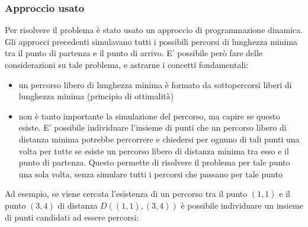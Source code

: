 \documentclass[a4paper,11pt]{article}
\begin{document}
\subsubsection{Approccio usato}

Per risolvere il problema è stato usato un approccio di programmazione dinamica. Gli approcci precedenti simulavano tutti i possibili percorsi di lunghezza minima tra il punto di partenza e il punto di arrivo. E' possibile però fare delle considerazioni su tale problema, e astrarne i concetti fondamentali:

\begin{itemize}
    \item un percorso libero di lunghezza minima è formato da sottopercorsi liberi di lunghezza minima (principio di ottimalità)

    \item non è tanto importante la simulazione del percorso, ma capire se questo esiste. E' possibile individuare l'insieme di punti che un percorso libero di distanza minima potrebbe percorrere e chiedersi per ognuno di tali punti una volta per tutte se esiste un percorso libero di distanza minima tra esso e il punto di partenza. Questo permette di risolvere il problema per tale punto una sola volta, senza simulare tutti i percorsi che passano per tale punto
\end{itemize}

Ad esempio, se viene cercata l'esistenza di un percorso tra il punto $(1, 1)$ e il punto $(3, 4)$ di distanza $D((1, 1), (3, 4))$ è possibile individuare un insieme di punti candidati ad essere percorsi:

\begin{center}
\end{center}
\end{document}
